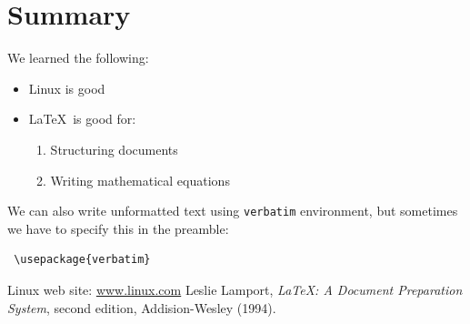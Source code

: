 \documentclass[a4paper,12pt,twoside]{article}
\begin{document}
\section{Summary}\label{sec:sum}
We learned the following:
\begin{itemize}
 \item Linux is good
 \item \LaTeX \ is good for:
   \begin{enumerate}
    \item Structuring documents
    \item Writing mathematical equations
   \end{enumerate}
\end{itemize}

We can also write unformatted text using \texttt{verbatim} environment, but sometimes we have to specify this in the preamble:
\begin{verbatim}
 \usepackage{verbatim}
\end{verbatim}

\begin{thebibliography}{99}
  Linux web site: \url{www.linux.com}
  Leslie Lamport, \textsl{LaTeX: A Document Preparation System}, second edition, Addision-Wesley (1994).
\end{thebibliography}
\end{document}
